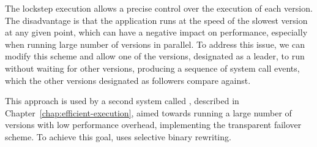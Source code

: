The lockstep execution allows a precise control over the execution of each
version. The disadvantage is that the application runs at the speed of the
slowest version at any given point, which can have a negative impact on
performance, especially when running large number of versions in parallel. To
address this issue, we can modify this scheme and allow one of the versions,
designated as a leader, to run without waiting for other versions, producing a
sequence of system call events, which the other versions designated as
followers compare against.

This approach is used by a second system called \varan, described in
Chapter~\ref{chap:efficient-execution}, aimed towards running a large number of
versions with low performance overhead, implementing the transparent failover
scheme. To achieve this goal, \varan uses selective binary rewriting.


